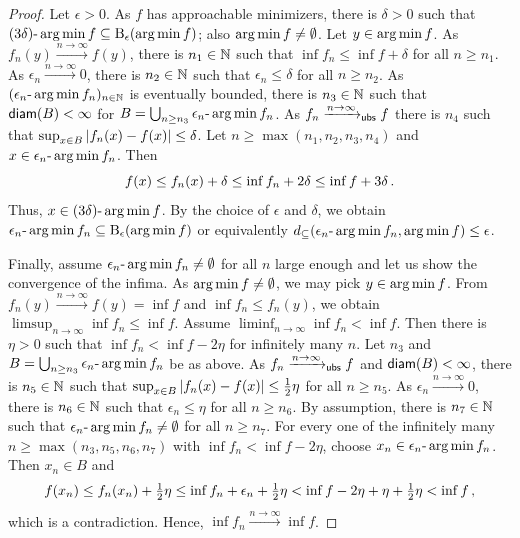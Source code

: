 \begin{proof}
		Let $\epsilon >0$. As $f$ has approachable minimizers, there is $\delta > 0$ such that $(3\delta)\text{-}\operatorname*{arg\,min} f \subseteq \operatorname{\mathrm{B}}_\epsilon(\operatorname*{arg\,min} f)$; also $\operatorname*{arg\,min} f \neq \emptyset$. Let $y\in\operatorname*{arg\,min} f$. As $f_n(y) \xrightarrow{n\to\infty} f(y)$, there is $n_1\in\mathbb{N}$ such that $\inf f_n \leq \inf f + \delta$ for all $n \geq n_1$.		
		As $\epsilon_n \xrightarrow{n\to\infty} 0$, there is $n_2\in\mathbb{N}$ such that $\epsilon_n \leq \delta$ for all $n \geq n_2$.
		As $(\epsilon_n\text{-}\operatorname*{arg\,min} f_n)_{n\in\mathbb{N}}$ is eventually bounded, there is $n_3\in\mathbb{N}$ such that $\operatorname{\mathsf{diam}}(B) < \infty$ for $B = \bigcup_{n\geq n_3} \epsilon_n\text{-}\operatorname*{arg\,min} f_n$.
		As $f_n \xrightarrow{n\to\infty}_{\mathsf{ubs}} f$ there is $n_4$ such that $\sup_{x\in B}\left| f_n(x) - f(x) \right| \leq \delta$.
		Let $n \geq \max(n_1, n_2, n_3, n_4)$ and $x \in \epsilon_n\text{-}\operatorname*{arg\,min} f_n$. Then
		\begin{equation*}
			f(x) \leq f_n(x) + \delta \leq \inf f_n + 2\delta \leq \inf f + 3\delta\, .
		\end{equation*}
		Thus, $x \in (3\delta)\text{-}\operatorname*{arg\,min} f$. By the choice of $\epsilon$ and $\delta$, we obtain $\epsilon_n\text{-}\operatorname*{arg\,min} f_n \subseteq \operatorname{\mathrm{B}}_\epsilon(\operatorname*{arg\,min} f)$ or equivalently $d_{\subseteq}(\epsilon_n\text{-}\operatorname*{arg\,min} f_n, \operatorname*{arg\,min} f) \leq \epsilon$.
		
		Finally, assume $\epsilon_n\text{-}\operatorname*{arg\,min} f_n \neq \emptyset$ for all $n$ large enough and let us show the convergence of the infima.
		As $\operatorname*{arg\,min} f \neq \emptyset$, we may pick $y \in \operatorname*{arg\,min} f$. From $f_n(y) \xrightarrow{n\to\infty} f(y) = \inf f$ and $\inf f_n \leq f_n(y)$, we obtain $\limsup_{n\to\infty} \inf f_n \leq \inf f$.
		Assume $\liminf_{n\to\infty} \inf f_n < \inf f$. Then there is $\eta > 0$ such that $\inf f_n < \inf f - 2\eta$ for infinitely many $n$. Let $n_3$ and $B = \bigcup_{n\geq n_3} \epsilon_n\text{-}\operatorname*{arg\,min} f_n$ be as above. As $f_n \xrightarrow{n\to\infty}_{\mathsf{ubs}} f$ and $\operatorname{\mathsf{diam}}(B)<\infty$, there is $n_5\in\mathbb{N}$ such that $\sup_{x\in B}\left| f_n(x) - f(x) \right| \leq \frac12 \eta$ for all $n \geq n_5$. As $\epsilon_n \xrightarrow{n\to\infty} 0$, there is $n_6\in\mathbb{N}$ such that $\epsilon_n \leq \eta$ for all $n\geq n_6$. By assumption, there is $n_7\in\mathbb{N}$ such that $\epsilon_n\text{-}\operatorname*{arg\,min} f_n \neq \emptyset$ for all $n \geq n_7$. For every one of the infinitely many $n \geq \max(n_3, n_5, n_6, n_7)$ with $\inf f_n < \inf f - 2\eta$, choose $x_n \in \epsilon_n\text{-}\operatorname*{arg\,min} f_n$. Then $x_n \in B$ and
		\begin{equation*}
			f(x_n) \leq f_n(x_n) + \tfrac12\eta \leq \inf f_n + \epsilon_n + \tfrac12\eta < \inf f - 2\eta + \eta + \tfrac12\eta < \inf f
			\, ,
		\end{equation*}
		which is a contradiction. Hence, $\inf f_n \xrightarrow{n\to\infty} \inf f$.
\end{proof}
